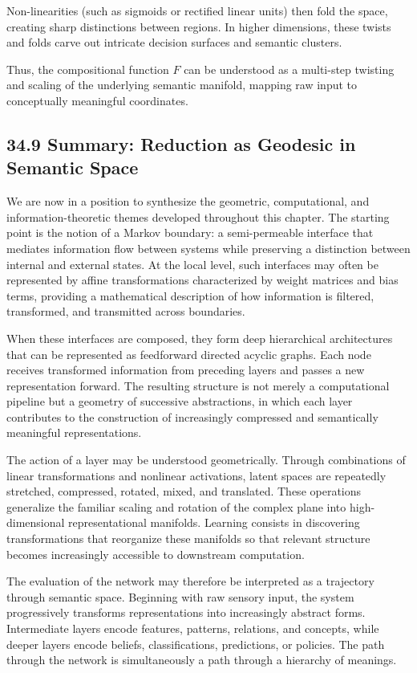 \documentclass[12pt,letterpaper]{article}
\theoremstyle{remark}
\begin{document}
Non-linearities (such as sigmoids or rectified linear units) then fold the space, creating sharp distinctions between regions. In higher dimensions, these twists and folds carve out intricate decision surfaces and semantic clusters.

Thus, the compositional function $F$ can be understood as a multi-step twisting and scaling of the underlying semantic manifold, mapping raw input to conceptually meaningful coordinates.

\subsection{34.9 Summary: Reduction as Geodesic in Semantic Space}

We are now in a position to synthesize the geometric, computational, and information-theoretic themes developed throughout this chapter. The starting point is the notion of a Markov boundary: a semi-permeable interface that mediates information flow between systems while preserving a distinction between internal and external states. At the local level, such interfaces may often be represented by affine transformations characterized by weight matrices and bias terms, providing a mathematical description of how information is filtered, transformed, and transmitted across boundaries.

When these interfaces are composed, they form deep hierarchical architectures that can be represented as feedforward directed acyclic graphs. Each node receives transformed information from preceding layers and passes a new representation forward. The resulting structure is not merely a computational pipeline but a geometry of successive abstractions, in which each layer contributes to the construction of increasingly compressed and semantically meaningful representations.

The action of a layer may be understood geometrically. Through combinations of linear transformations and nonlinear activations, latent spaces are repeatedly stretched, compressed, rotated, mixed, and translated. These operations generalize the familiar scaling and rotation of the complex plane into high-dimensional representational manifolds. Learning consists in discovering transformations that reorganize these manifolds so that relevant structure becomes increasingly accessible to downstream computation.

The evaluation of the network may therefore be interpreted as a trajectory through semantic space. Beginning with raw sensory input, the system progressively transforms representations into increasingly abstract forms. Intermediate layers encode features, patterns, relations, and concepts, while deeper layers encode beliefs, classifications, predictions, or policies. The path through the network is simultaneously a path through a hierarchy of meanings.
\end{document}
